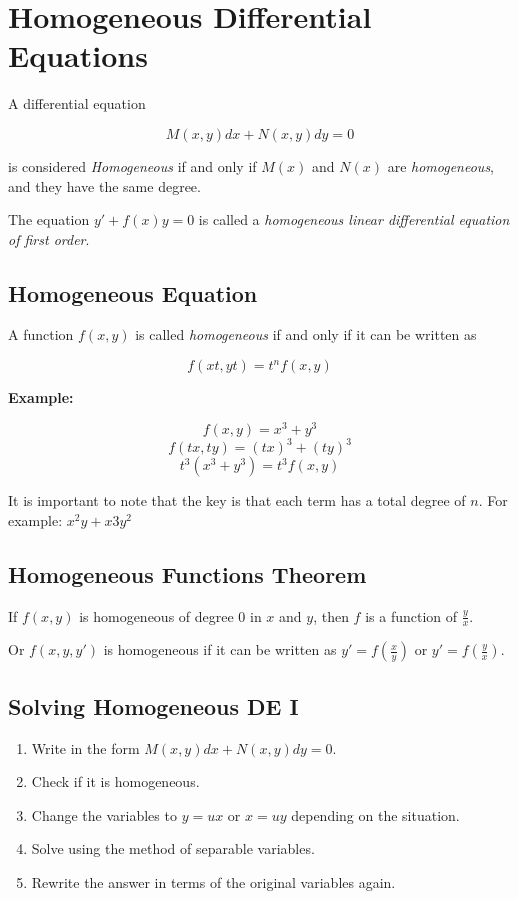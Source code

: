 \section{Homogeneous Differential Equations}

A differential equation

\[
    M(x,y)dx + N(x,y)dy = 0
\]

is considered \emph{Homogeneous} if and only if
\(M(x)\) and \(N(x)\) are \emph{homogeneous}, and they have the same degree.

The equation \(y' + f(x)y = 0\) is called a \emph{homogeneous linear differential equation of first order}.

\subsection{Homogeneous Equation}

A function \(f(x,y)\) is called \emph{homogeneous} if and only if it can be written as

\[
    f(xt, yt) = t^n f(x,y)
\]

\textbf{Example: }

\[
    f(x,y) = x^3 + y^3
\]
\[
    f(tx, ty) = {(tx)}^3 + {(ty)}^3
\]
\[
    t^3 (x^3 + y^3) = t^3 f(x,y)
\]

It is important to note that the key is that each term has a total degree of \(n\).
For example: \(x^2y + x3y^2\)

\subsection{Homogeneous Functions Theorem}

If \(f(x,y)\) is homogeneous of degree \(0\) in \(x\) and \(y\), then
\(f\) is a function of \(\frac{y}{x}\).

Or \(f(x,y,y')\) is homogeneous if it can be written as \(y' = f(\frac{x}{y})\) or \(y' = f(\frac{y}{x})\).

\subsection{Solving Homogeneous DE I}

\begin{enumerate}

    \item Write in the form \(M(x,y)dx + N(x,y)dy = 0\).

    \item Check if it is homogeneous.

    \item Change the variables to \(y = ux\) or \(x = uy\) depending on the situation.

    \item Solve using the method of separable variables.

    \item Rewrite the answer in terms of the original variables again.

\end{enumerate}


